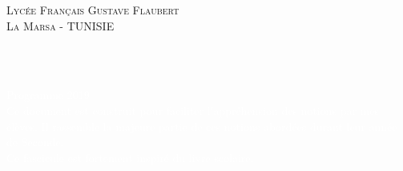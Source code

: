 \thispagestyle{empty}


\vspace{0.5cm}
\begin{center}
     {\color{bleu3} \textsc{\LARGE Lycée Français Gustave Flaubert}\\
    \vspace{0.5cm}
    \textsc{\Large La Marsa - TUNISIE}\\
 }
              \vspace{4.5cm}
              

     \begin{center}
        \textcolor{bleu3}{ {\fontsize{50}{50}\selectfont \bfseries {}} \\
          \vspace{2cm}
          \textbf{{\fontsize{30}{30}\selectfont {\sffamily Seconde}}}\\
             }
     \end{center}


 



 \vspace{6cm}  
 
    \begin{minipage}{0.4\textwidth}
      \begin{center} 

     {\color{bleu3}       \large{\textsc{ }}}
      \end{center}
    \end{minipage}
     
 \vfill
 \vspace{3cm} 
 
 
    {\large \textcolor{white}{Programme 2019}}\\
    
    {\large \textcolor{white}{Ce document est construit pour faciliter l'appréhension des notions par mes élèves. Il rassemble la majeure partie de ces notions abordées durant leur année de Seconde. \\ Ce fascicule est fortement inspiré du livre scolaire.}}
  \end{center}   


\newpage


  \tableofcontents 